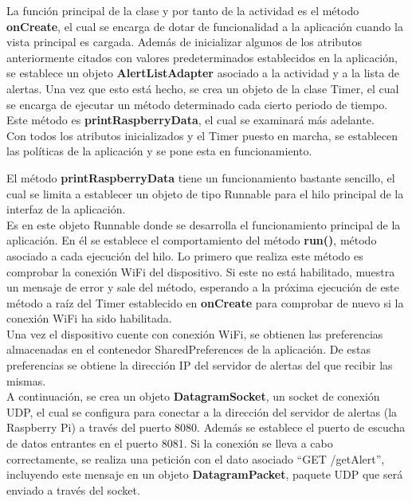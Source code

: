         La función principal de la clase y por tanto de la actividad es el método \textbf{onCreate}, el cual se encarga de dotar de funcionalidad a la aplicación cuando la vista principal es cargada. Además de inicializar algunos de los atributos anteriormente citados con valores predeterminados establecidos en la aplicación, se establece un objeto \textbf{AlertListAdapter} asociado a la actividad y a la lista de alertas. Una vez que esto está hecho, se crea un objeto de la clase Timer, el cual se encarga de ejecutar un método determinado cada cierto periodo de tiempo. Este método es \textbf{printRaspberryData}, el cual se examinará más adelante. \\

        Con todos los atributos inicializados y el Timer puesto en marcha, se establecen las políticas de la aplicación y se pone esta en funcionamiento. \\

        \vspace{0.3cm}

        El método \textbf{printRaspberryData} tiene un funcionamiento bastante sencillo, el cual se limita a establecer un objeto de tipo Runnable para el hilo principal de la interfaz de la aplicación. \\

        Es en este objeto Runnable donde se desarrolla el funcionamiento principal de la aplicación. En él se establece el comportamiento del método \textbf{run()}, método asociado a cada ejecución del hilo. Lo primero que realiza este método es comprobar la conexión WiFi del dispositivo. Si este no está habilitado, muestra un mensaje de error y sale del método, esperando a la próxima ejecución de este método a raíz del Timer establecido en \textbf{onCreate} para comprobar de nuevo si la conexión WiFi ha sido habilitada. \\

        Una vez el dispositivo cuente con conexión WiFi, se obtienen las preferencias almacenadas en el contenedor SharedPreferences de la aplicación. De estas preferencias se obtiene la dirección IP del servidor de alertas del que recibir las mismas. \\

        A continuación, se crea un objeto \textbf{DatagramSocket}, un socket de conexión UDP, el cual se configura para conectar a la dirección del servidor de alertas (la Raspberry Pi) a través del puerto 8080. Además se establece el puerto de escucha de datos entrantes en el puerto 8081. Si la conexión se lleva a cabo correctamente, se realiza una petición con el dato asociado ``GET /getAlert'', incluyendo este mensaje en un objeto \textbf{DatagramPacket}, paquete UDP que será enviado a través del socket. \\

